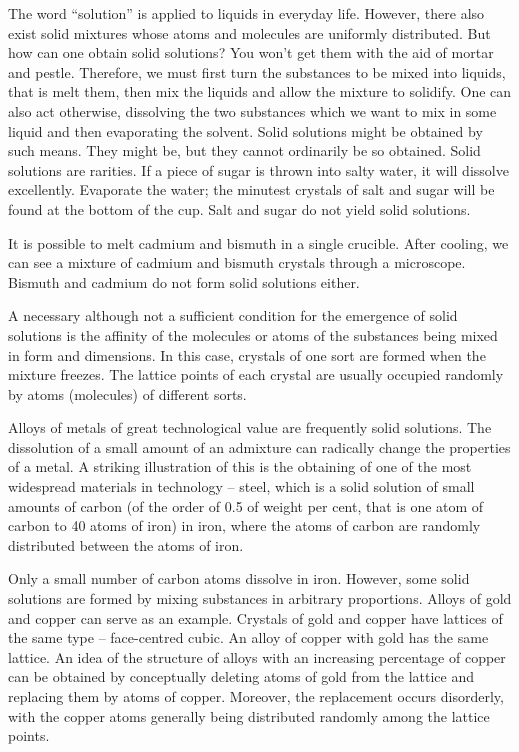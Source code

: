 The word ``solution'' is applied to liquids in everyday life. However, there also exist solid mixtures whose atoms and molecules are uniformly distributed. But how can one obtain solid solutions? You won’t get them with the aid of mortar and pestle. Therefore, we must first turn the substances to be mixed into liquids, that is melt them, then mix the liquids and allow the mixture to solidify. One can also act otherwise, dissolving the two substances which we want to mix in some liquid and then evaporat­ing the solvent. Solid solutions might be obtained by such means. They might be, but they cannot ordinarily be so obtained. Solid solutions are rarities. If a piece of sugar is thrown into salty water, it will dissolve excel­lently. Evaporate the water; the minutest crystals of salt and sugar will be found at the bottom of the cup. Salt and sugar do not yield solid solutions.

It is possible to melt cadmium and bismuth in a single crucible. After cooling, we can see a mixture of cadmium and bismuth crystals through a microscope. Bismuth and cadmium do not form solid solutions either.

A necessary although not a sufficient condition for the emergence of solid solutions is the affinity of the molecules or atoms of the substances being mixed in form and dimensions. In this case, crystals of one sort are formed when the mixture freezes. The lattice points of each crystal are usually occupied randomly by atoms (molecules) of differ­ent sorts.

Alloys of metals of great technological value are fre­quently solid solutions. The dissolution of a small amount of an admixture can radically change the properties of a metal. A striking illustration of this is the obtaining of one of the most widespread materials in technology -- steel, which is a solid solution of small amounts of carbon (of the order of 0.5 of weight per cent, that is one atom of carbon to 40 atoms of iron) in iron, where the atoms of carbon are randomly distributed between the atoms of iron.

Only a small number of carbon atoms dissolve in iron. However, some solid solutions are formed by mixing substances in arbitrary proportions. Alloys of gold and copper can serve as an example. Crystals of gold and copper have lattices of the same type -- face-centred cubic. An alloy of copper with gold has the same lattice. An idea of the structure of alloys with an increasing percentage of copper can be obtained by conceptually deleting atoms of gold from the lattice and replacing them by atoms of copper. Moreover, the replacement occurs disorderly, with the copper atoms generally being distributed random­ly among the lattice points.


